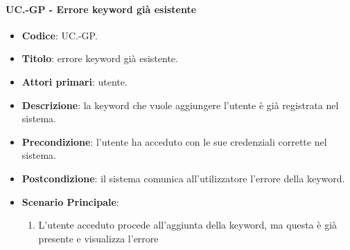 	\paragraph{UC\theuccount.\thesubuccount-GP - Errore keyword già esistente}
	
	\begin{itemize}
		\item \textbf{Codice}: UC\theuccount.\thesubuccount-GP.
		\item \textbf{Titolo}: errore keyword già esistente.
		\item \textbf{Attori primari}: utente.
		\item \textbf{Descrizione}: la keyword che vuole aggiungere l'utente è già registrata nel sistema.
		\item \textbf{Precondizione}:  l’utente ha acceduto con le sue credenziali corrette nel sistema.
		\item \textbf{Postcondizione}: il sistema comunica all’utilizzatore l’errore della keyword.
		\item \textbf{Scenario Principale}:
		\begin{enumerate}
			\item L'utente acceduto procede all'aggiunta della keyword, ma questa è già presente e visualizza l'errore
		\end{enumerate}
	\end{itemize}